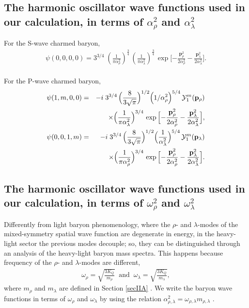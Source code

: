 \documentclass[twocolumn,superscriptaddress,preprintnumbers,nofootinbib]{revtex4}
\begin{document}
\subsection{The harmonic oscillator wave functions used in our
calculation, in terms of $\alpha^2_{\rho}$ and $\alpha^2_{\lambda}$}


For the S-wave charmed baryon,
\begin{eqnarray}
\psi(0,0,0,0)=3^{3/4}\;(\frac{1}{\pi
\alpha^2_{\rho}})^{\frac{3}{4}}\,(\frac{1}{\pi
\alpha^2_{\lambda}})^{\frac{3}{4}}\,\exp\Big[{-\frac{
{\mathbf{p}}^2_{\rho}}{2\alpha^2_{\rho}} -\frac{
{\mathbf{p}}^2_{\lambda}}{2\alpha^2_{\lambda}}}\Big].\nonumber\\
\end{eqnarray}

For the P-wave charmed baryon,
\begin{eqnarray}
\psi(1,m,0,0)&=&-i\;3^{3/4}\,\Big(\frac{8}{3\sqrt{\pi}}\Big)^{{1}/{2}}\Big({1}/{
\alpha^2_{\rho}}\Big)^{ {5}/{4}}\,{\cal
Y}^m_1({\mathbf{p}}_{\rho})\nonumber\\&&\times\Big(\frac{1}{\pi
\alpha^2_{\lambda}}\Big)^{{3}/{4}}\,\exp\Big[{-\frac{{\mathbf{p}}^2_{\rho}}{2\alpha^2_{\rho}}
-\frac{{\mathbf{p}}^2_{\lambda}}{2\alpha^2_{\lambda}}}\Big],\\
\psi(0,0,1,m)&=&-i\;3^{3/4}\,\Big(\frac{8}{3\sqrt{\pi}}\Big)^{{1}/{2}}\Big(\frac{1}{
\alpha^2_{\lambda}}\Big)^{{5}/{4}}\,{\cal
Y}^m_1({\mathbf{p}}_{\lambda})\nonumber\\&&\times \Big(\frac{1}{\pi
\alpha^2_{\rho}}\Big)^{{3}/{4}}\,\exp\Big[{-\frac{{\mathbf{p}}^2_{\rho}}{2\alpha^2_{\rho}}
-\frac{{\mathbf{p}}^2_{\lambda}}{2\alpha^2_{\lambda}}}\Big].
\end{eqnarray}

\subsection{The harmonic oscillator wave functions used in our
calculation, in terms of $\omega^2_{\rho}$ and $\omega^2_{\lambda}$}
Differently from light baryon phenomenology, where the $\rho$- and $\lambda$-modes of the mixed-symmetry spatial wave function are degenerate in energy, in the heavy-light sector the previous modes decouple; so, they can be distinguished through an analysis of the heavy-light baryon mass spectra.
This happens because frequency of the $\rho$- and $\lambda$-modes are different, 
\begin{eqnarray}
\omega_{\rho}=\sqrt{\frac{3 K_Q}{m_{\rho}}} \;\; \text{and} \;\;\omega_{\lambda}=\sqrt{\frac{3 K_Q}{m_{\lambda}}},
\end{eqnarray}
where $m_{\rho}$ and $m_{\lambda}$ are defined in Section \ref{secIIA} .  We write the baryon wave functions in terms of $\omega_{\rho}$ and $\omega_{\lambda}$ by using the relation $\alpha^2_{\rho,\lambda}=\omega_{\rho,\lambda}m_{\rho,\lambda}$ . 
\end{document}
